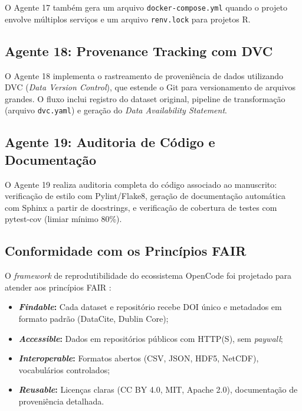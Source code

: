 O Agente 17 também gera um arquivo \texttt{docker-compose.yml}
quando o projeto envolve múltiplos serviços e um arquivo
\texttt{renv.lock} para projetos R.

\subsection{Agente 18: Provenance Tracking com DVC}
\label{sec:agente18_dvc}

O Agente 18 implementa o rastreamento de proveniência de dados
utilizando DVC (\textit{Data Version Control}), que estende o Git
para versionamento de arquivos grandes. O fluxo inclui registro do
dataset original, pipeline de transformação (arquivo
\texttt{dvc.yaml}) e geração do \textit{Data Availability Statement}.

\subsection{Agente 19: Auditoria de Código e Documentação}
\label{sec:agente19_docs}

O Agente 19 realiza auditoria completa do código associado ao
manuscrito: verificação de estilo com Pylint/Flake8, geração de
documentação automática com Sphinx a partir de docstrings, e
verificação de cobertura de testes com pytest-cov (limiar mínimo
80\%).

\subsection{Conformidade com os Princípios FAIR}
\label{sec:fair}

O \textit{framework} de reprodutibilidade do ecossistema OpenCode
foi projetado para atender aos princípios FAIR
\cite{Wilkinson2016_FAIR}:

\begin{itemize}
    \item \textbf{\textit{Findable}:} Cada dataset e repositório
    recebe DOI único e metadados em formato padrão (DataCite,
    Dublin Core);

    \item \textbf{\textit{Accessible}:} Dados em repositórios
    públicos com HTTP(S), sem \textit{paywall};

    \item \textbf{\textit{Interoperable}:} Formatos abertos (CSV,
    JSON, HDF5, NetCDF), vocabulários controlados;

    \item \textbf{\textit{Reusable}:} Licenças claras (CC BY 4.0,
    MIT, Apache 2.0), documentação de proveniência detalhada.
\end{itemize}

